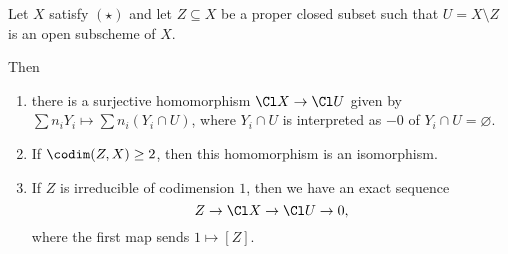 Let $X$ satisfy $(\star)$ and let $Z \subseteq X$ be a proper closed subset such
that $U = X\setminus Z$ is an open subscheme of $X$.

Then
\begin{enumerate}
	\item there is a surjective homomorphism $\Cl X\to \Cl U$ given by
		$\sum n_iY_i\mapsto \sum n_i(Y_i\cap U)$, where $Y_i\cap U$ is interpreted as $-0$
		of $Y_i\cap U = \varnothing$.
	\item If $\codim(Z, X) \geq 2$, then this homomorphism is an isomorphism.
	\item If $Z$ is irreducible of codimension $1$, then we have an exact sequence
		\[ Z\to \Cl X\to \Cl U\to 0, \]
		where the first map sends $1 \mapsto [Z]$.
\end{enumerate}
